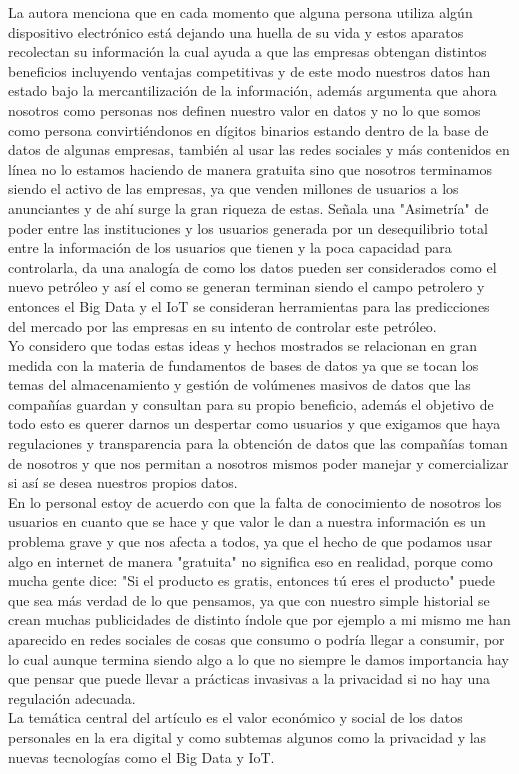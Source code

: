 \documentclass[12pt]{report}
\begin{document}
\begin{enumerate}[label=\textbf{\arabic*.}, leftmargin=*]
\begin{enumerate}[label=\textbf{\alph*.}, leftmargin=*, itemsep=1.0em]
La autora menciona que en cada momento que alguna persona utiliza algún dispositivo electrónico está dejando una huella de su vida y estos aparatos recolectan su información la cual ayuda a que las empresas obtengan distintos beneficios incluyendo ventajas competitivas y de este modo nuestros datos han estado bajo la mercantilización de la información, además argumenta que ahora nosotros como personas nos definen nuestro valor en datos y no lo que somos como persona convirtiéndonos en dígitos binarios estando dentro de la base de datos de algunas empresas, también al usar las redes sociales y más contenidos en línea no lo estamos haciendo de manera gratuita sino que nosotros terminamos siendo el activo de las empresas, ya que venden millones de usuarios a los anunciantes y de ahí surge la gran riqueza de estas. Señala una "Asimetría" de poder entre las instituciones y los usuarios generada por un desequilibrio total entre la información de los usuarios que tienen y la poca capacidad para controlarla, da una analogía de como los datos pueden ser considerados como el nuevo petróleo y así el como se generan terminan siendo el campo petrolero y entonces el Big Data y el IoT se consideran herramientas para las predicciones del mercado por las empresas en su intento de controlar este petróleo.\\

Yo considero que todas estas ideas y hechos mostrados se relacionan en gran medida con la materia de fundamentos de bases de datos ya que se tocan los temas del almacenamiento y gestión de volúmenes masivos de datos que las compañías guardan y consultan para su propio beneficio, además el objetivo de todo esto es querer darnos un despertar como usuarios y que exigamos que haya regulaciones y transparencia para la obtención de datos que las compañías toman de nosotros y que nos permitan a nosotros mismos poder manejar y comercializar si así se desea nuestros propios datos.\\
En lo personal estoy de acuerdo con que la falta de conocimiento de nosotros los usuarios en cuanto que se hace y que valor le dan a nuestra información es un problema grave y que nos afecta a todos, ya que el hecho de que podamos usar algo en internet de manera "gratuita" no significa eso en realidad, porque como mucha gente dice: "Si el producto es gratis, entonces tú eres el producto" puede que sea más verdad de lo que pensamos, ya que con nuestro simple historial se crean muchas publicidades de distinto índole que por ejemplo a mi mismo me han aparecido en redes sociales de cosas que consumo o podría llegar a consumir, por lo cual aunque termina siendo algo a lo que no siempre le damos importancia hay que pensar que puede llevar a prácticas invasivas a la privacidad si no hay una regulación adecuada.\\
La temática central del artículo es el valor económico y social de los datos personales en la era digital y como subtemas algunos como la privacidad y las nuevas tecnologías como el Big Data y IoT.\\


\end{enumerate}
\end{enumerate}
\end{document}
